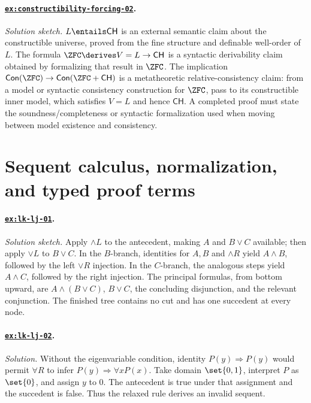 \paragraph{\hyperref[ex:constructibility-forcing-02]{\texttt{ex:constructibility-forcing-02}}.}
\textit{Solution sketch.}  \(L\entails\mathsf{CH}\) is an external semantic
claim about the constructible universe, proved from the fine structure and
definable well-order of \(L\).  The formula
\(\ZFC\derives V=L\to\mathsf{CH}\) is a syntactic derivability claim obtained
by formalizing that result in \(\ZFC\).  The implication
\(\mathsf{Con}(\ZFC)\to\mathsf{Con}(\ZFC+\mathsf{CH})\) is a
metatheoretic relative-consistency claim: from a model or syntactic consistency
construction for \(\ZFC\), pass to its constructible inner model, which
satisfies \(V=L\) and hence \(\mathsf{CH}\).  A completed proof must state the
soundness/completeness or syntactic formalization used when moving between
model existence and consistency.

\section{Sequent calculus, normalization, and typed proof terms}

\paragraph{\hyperref[ex:lk-lj-01]{\texttt{ex:lk-lj-01}}.}
\textit{Solution sketch.}  Apply \(\land L\) to the antecedent, making
\(A\) and \(B\lor C\) available; then apply \(\lor L\) to \(B\lor C\).  In
the \(B\)-branch, identities for \(A,B\) and \(\land R\) yield
\(A\land B\), followed by the left \(\lor R\) injection.  In the
\(C\)-branch, the analogous steps yield \(A\land C\), followed by the right
injection.  The principal formulas, from bottom upward, are
\(A\land(B\lor C)\), \(B\lor C\), the concluding disjunction, and the
relevant conjunction.  The finished tree contains no cut and has one succedent at every
node.

\paragraph{\hyperref[ex:lk-lj-02]{\texttt{ex:lk-lj-02}}.}
\textit{Solution.}  Without the eigenvariable condition, identity
\(P(y)\Rightarrow P(y)\) would permit \(\forall R\) to infer
\(P(y)\Rightarrow\forall xP(x)\).  Take domain \(\set{0,1}\), interpret
\(P\) as \(\set{0}\), and assign \(y\) to \(0\).  The antecedent is true under
that assignment and the succedent is false.  Thus the relaxed rule derives an
invalid sequent.

